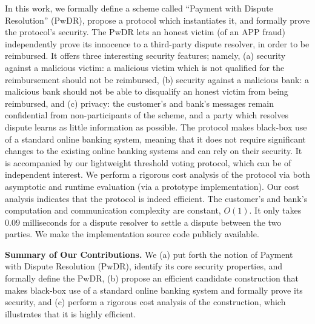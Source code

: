 In this work, we formally define a scheme called ``Payment with Dispute Resolution'' (PwDR),  propose a protocol which instantiates it, and formally prove the protocol's security.  The PwDR lets an honest victim (of an APP fraud)  independently prove its innocence to a third-party dispute resolver, in order to be reimbursed.  It offers three interesting security features; namely, (a) security against a malicious victim: a malicious victim  which is not qualified for the reimbursement should not be reimbursed, (b) security against a malicious bank: a malicious bank should not be able to disqualify an honest victim  from being reimbursed, and (c) privacy: the customer’s and bank’s messages remain confidential from non-participants of the scheme, and a party which resolves dispute  learns as little information as possible.  The  protocol makes black-box use of a standard  online banking system, meaning that it does not require significant changes to the existing online banking systems and can rely on their security. It is accompanied by our lightweight threshold voting protocol, which can be of independent interest. We perform a rigorous cost analysis of the protocol via both asymptotic and runtime  evaluation (via a prototype implementation). Our cost analysis indicates that the protocol is indeed efficient. The customer's and bank's computation and communication complexity are constant, $O(1)$. It only takes $0.09$ milliseconds for a dispute resolver to settle a dispute between the two parties. We  make  the implementation source code publicly available.
  





\vspace{2mm}

\noindent\textbf{Summary of Our Contributions.} We (a) put forth the notion of Payment with Dispute Resolution (PwDR), identify its core security properties, and  formally define the PwDR, (b) propose an efficient candidate construction that makes black-box use of a standard  online banking system and formally prove its security, and (c) perform a rigorous cost analysis of the construction, which illustrates that it is highly efficient.     

\

\

\



